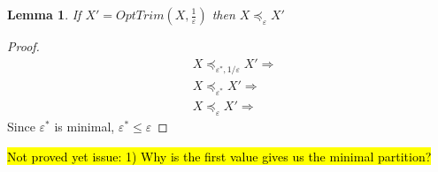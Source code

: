 \documentclass[review]{elsarticle}
\newtheorem{lemma}{Lemma}
\begin{document}
\begin{lemma}
If $X'=OptTrim (X, \frac{1}{\varepsilon})$ then $X\preceq_{\varepsilon} X'$
\end{lemma}
\begin{proof}
\begin{align*}
&X\preceq_{\varepsilon^*,1/\varepsilon } X' \Rightarrow \\
& X\preceq_{\varepsilon^*} X' \Rightarrow \\
& X\preceq_{\varepsilon} X' \Rightarrow 
\end{align*}
Since $\varepsilon^*$ is minimal, $\varepsilon^* \leq \varepsilon$ 
\end{proof}



\hl{Not proved yet issue:
1) Why is the first value gives us the minimal partition?}
\end{document}
